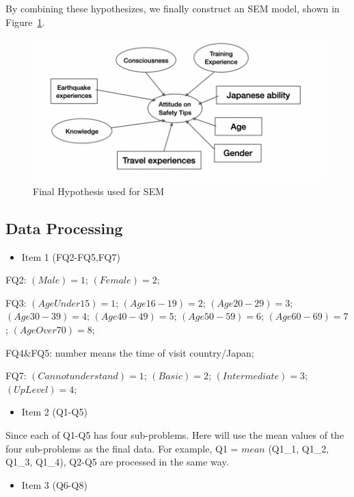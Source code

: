 By combining these hypothesizes, we finally construct an SEM model, shown in Figure~\ref{fig9}. 

\begin{figure}[h]
  \includegraphics[width=\linewidth]{Figure/Figure9.png}
  \centering
  \caption{Final Hypothesis used for SEM }
  \label{fig9}
\end{figure}

\subsection{Data Processing}
\begin{itemize}
\item Item 1 (FQ2-FQ5,FQ7)
\end{itemize}

FQ2: $(Male) = 1$; $(Female) = 2$;

FQ3: $(Age Under 15) = 1$; $(Age 16-19) = 2$; $(Age 20-29) = 3$; $(Age 30-39) = 4$; $(Age 40-49) = 5$; $(Age 50-59) = 6$; $(Age 60-69) = 7$; $(Age Over 70) = 8$;

FQ4\&FQ5: number means the time of visit country/Japan;

FQ7: $(Cannot understand) = 1$; $(Basic) = 2$; $(Intermediate) = 3$; $(Up Level) = 4$; 

\begin{itemize}
\item Item 2 (Q1-Q5)
\end{itemize}

Since each of Q1-Q5 has four sub-problems. Here will use the mean values of the four sub-problems as the final data. For example, Q1 = $mean$ (Q1\_1, Q1\_2, Q1\_3, Q1\_4), Q2-Q5 are processed in the same way.

\begin{itemize}
\item Item 3 (Q6-Q8)
\end{itemize}

